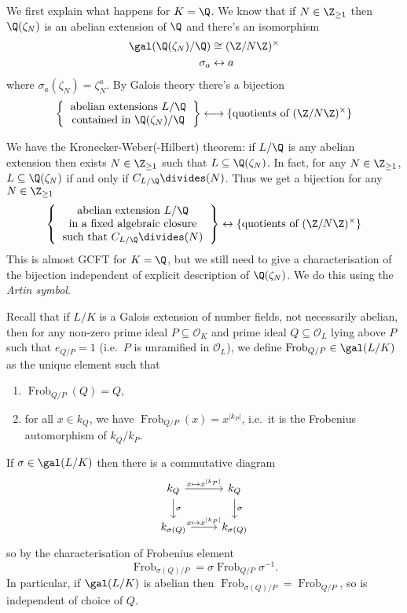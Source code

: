 \documentclass[a4paper]{article}
\renewcommand*{\O}{\mathcal{O}}
\DeclareMathOperator{\Frob}{Frob} %
\begin{document}
We first explain what happens for \(K = \Q\). We know that if \(N \in \Z_{\geq 1}\) then \(\Q(\zeta_N)\) is an abelian extension of \(\Q\) and there's an isomorphism
\begin{align*}
  \gal(\Q(\zeta_N)/\Q) &\cong (\Z/N\Z)^\times \\
  \sigma_a &\leftrightarrow a
\end{align*}
where \(\sigma_a(\zeta_N) = \zeta_N^a\). By Galois theory there's a bijection
\[
  \left\{
  \begin{tabular}{c}
    abelian extensions \(L/\Q\) \\
    contained in \(\Q(\zeta_N)/\Q\)
  \end{tabular}
  \right\}
  \longleftrightarrow
  \{\text{quotients of } (\Z/N\Z)^\times\}
\]

We have the Kronecker-Weber(-Hilbert) theorem: if \(L/\Q\) is any abelian extension then exists \(N \in \Z_{\geq 1}\) such that \(L \subseteq \Q(\zeta_N)\). In fact, for any \(N \in \Z_{\geq 1}\), \(L \subseteq \Q(\zeta_N)\) if and only if \(C_{L/\Q} \divides (N)\). Thus we get a bijection for any \(N \in \Z_{\geq 1}\)
\[
  \left\{
    \begin{tabular}{c}
      abelian extension \(L/\Q\) \\
      in a fixed algebraic closure \\
      such that \(C_{L/\Q} \divides (N)\)
    \end{tabular}
  \right\}
  \leftrightarrow
  \{\text{quotients of } (\Z/N\Z)^\times\}
\]
This is almost GCFT for \(K = \Q\), but we still need to give a characterisation of the bijection independent of explicit description of \(\Q(\zeta_N)\). We do this using the \emph{Artin symbol}.

Recall that if \(L/K\) is a Galois extension of number fields, not necessarily abelian, then for any non-zero prime ideal \(P \subseteq \O_K\) and prime ideal \(Q \subseteq \O_L\) lying above \(P\) such that \(e_{Q/P} = 1\) (i.e.\ \(P\) is unramified in \(\O_L\)), we define \(\Frob_{Q/P} \in \gal(L/K)\) as the unique element such that
\begin{enumerate}
\item \(\Frob_{Q/P}(Q) = Q\),
\item for all \(x \in k_Q\), we have \(\Frob_{Q/P}(x) = x^{|k_P|}\), i.e.\ it is the Frobenius automorphism of \(k_Q/k_P\).
\end{enumerate}
If \(\sigma \in \gal(L/K)\) then there is a commutative diagram
\[
  \begin{tikzcd}
    k_Q \ar[r, "x \mapsto x^{|k_P|}"] \ar[d, "\sigma"] & k_Q \ar[d, "\sigma"] \\
    k_{\sigma(Q)} \ar[r, "x \mapsto x^{|k_P|}"] & k_{\sigma(Q)}
  \end{tikzcd}
\]
so by the characterisation of Frobenius element
\[
  \Frob_{\sigma(Q)/P} = \sigma \Frob_{Q/P} \sigma^{-1}.
\]
In particular, if \(\gal(L/K)\) is abelian then \(\Frob_{\sigma(Q)/P} = \Frob_{Q/P}\), so is independent of choice of \(Q\).
\end{document}
